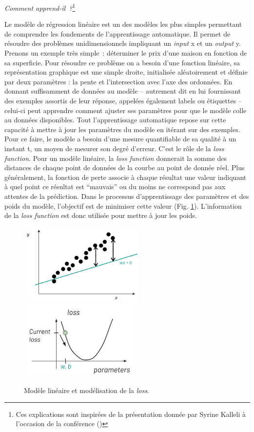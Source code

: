 \emph{Comment apprend-il~?}\footnote{Ces explications sont inspirées de
  la présentation donnée par Syrine Kalleli à l'occasion de la
  conférence  (\cite{noauthor_eida_nodate})}

Le modèle de régression linéaire est un des modèles les plus simples
permettant de comprendre les fondements de l'apprentissage automatique.
Il permet de résoudre des problèmes unidimensionnels impliquant un \textit{input}
x et un \textit{output} y. Prenons un exemple très simple~: déterminer le prix
d'une maison en fonction de sa superficie. Pour résoudre ce problème on
a besoin d'une fonction linéaire, sa représentation graphique est une
simple droite, initialisée aléatoirement et définie par deux paramètres
: la pente et l'intersection avec l'axe des ordonnées. En donnant
suffisamment de données au modèle -- autrement dit en lui fournissant des
exemples assortis de leur réponse, appelées également labels ou
étiquettes -- celui-ci peut apprendre comment ajuster ses paramètres
pour que le modèle colle au données disponibles. Tout l'apprentissage
automatique repose sur cette capacité à mettre à jour les paramètres du
modèle en itérant sur des exemples. Pour ce faire, le modèle a besoin d'une
mesure quantifiable de sa qualité à un instant t, un moyen de mesurer
son degré d'erreur. C'est le rôle de la \emph{loss function}. Pour un modèle linéaire, la \emph{loss function} donnerait la somme des
distances de chaque point de données de la courbe au point de donnée
réel. Plus généralement, la fonction de perte associe à chaque résultat
une valeur indiquant à quel point ce résultat est ``mauvais'' ou du
moins ne correspond pas aux attentes de la prédiction. Dans le processus
d'apprentissage des paramètres et des poids du modèle, l'objectif est de
minimiser cette valeur (Fig. \ref{fig:loss}). L'information de la \emph{loss function} est
donc utilisée pour mettre à jour les poids.

          \begin{figure}[H]
          \begin{center}
          \includegraphics[height=4cm]{figues/modele_lineaire_loss.png}
          \includegraphics[height=4cm]{figues/loss.png}
          \end{center}
          \caption{Modèle linéaire et modélisation de la \emph{loss}.}
          \label{fig:loss} \end{figure}

